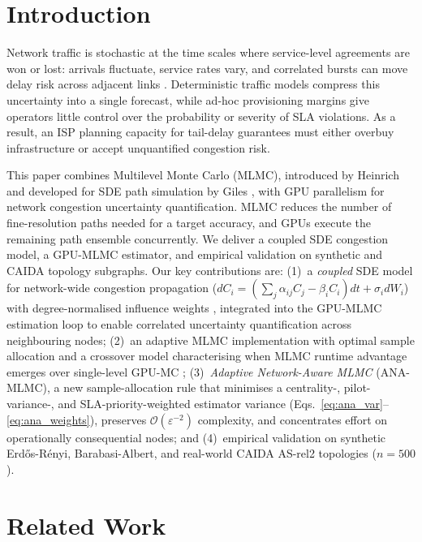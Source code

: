 \documentclass[pdflatex,sn-mathphys-num]{sn-jnl}
\theoremstyle{thmstyleone}%
\theoremstyle{thmstyletwo}%
\theoremstyle{thmstylethree}%
\begin{document}
\section{Introduction}

Network traffic is stochastic at the time scales where service-level agreements
are won or lost: arrivals fluctuate, service rates vary, and correlated bursts can move delay risk
across adjacent links \cite{kelly2011stochastic,whitt2002,cisco2023annual}. Deterministic traffic
models compress this uncertainty into a single forecast, while ad-hoc provisioning margins give
operators little control over the probability or severity of SLA violations. As a result, an ISP
planning capacity for tail-delay guarantees must either overbuy infrastructure or accept
unquantified congestion risk.

This paper combines Multilevel Monte Carlo (MLMC), introduced by Heinrich
\cite{heinrich2001multilevel} and developed for SDE path simulation by Giles
\cite{giles2008multilevel}, with GPU parallelism for network congestion uncertainty
quantification. MLMC reduces the number of fine-resolution paths needed for a target accuracy,
and GPUs execute the remaining path ensemble concurrently. We deliver a coupled SDE congestion
model, a GPU-MLMC estimator, and empirical validation on synthetic and CAIDA topology subgraphs.
Our key contributions are: (1)~a \emph{coupled} SDE model for network-wide congestion
propagation ($dC_i = (\sum_j \alpha_{ij}C_j - \beta_i C_i)dt + \sigma_i dW_i$) with
degree-normalised influence weights \cite{kang2007,harrison1985}, integrated into the
GPU-MLMC estimation loop to enable correlated uncertainty quantification across neighbouring
nodes; (2)~an adaptive MLMC implementation with optimal sample allocation and a crossover
model characterising when MLMC runtime advantage emerges over single-level GPU-MC
\cite{giles2015multilevel,collier2015}; (3)~\emph{Adaptive Network-Aware MLMC} (ANA-MLMC),
a new sample-allocation rule that minimises a centrality-, pilot-variance-, and
SLA-priority-weighted estimator variance
(Eqs.~\eqref{eq:ana_var}--\eqref{eq:ana_weights}), preserves
$\mathcal{O}(\varepsilon^{-2})$ complexity, and concentrates effort on operationally
consequential nodes; and (4)~empirical validation on synthetic Erd\H{o}s-R\'enyi,
Barabasi-Albert, and real-world CAIDA AS-rel2 topologies ($n=500$).

\section{Related Work}
\end{document}
